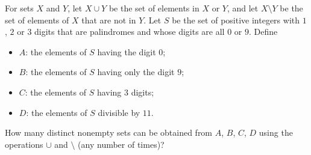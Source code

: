 For sets $X$ and $Y$, let $X\cup Y$ be the set of elements in $X$ or $Y$, and let $X\setminus Y$ be the set of elements of $X$ that are not in $Y$. Let $S$ be the set of positive integers with $1$, $2$ or $3$ digits that are palindromes and whose digits are all $0$ or $9$. Define
\begin{itemize}
\item $A$: the elements of $S$ having the digit $0$;
\item $B$: the elements of $S$ having only the digit $9$;
\item $C$: the elements of $S$ having $3$ digits;
\item $D$: the elements of $S$ divisible by $11$.
\end{itemize}
How many distinct nonempty sets can be obtained from $A$, $B$, $C$, $D$ using the operations $\cup$ and $\setminus$ (any number of times)?
